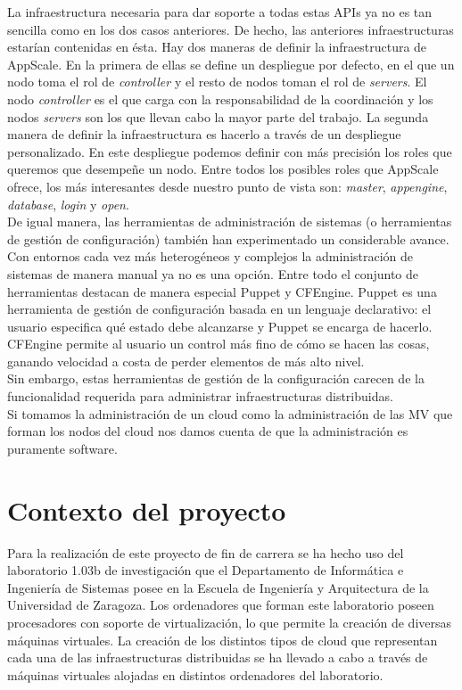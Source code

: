 La infraestructura necesaria para dar soporte a todas estas APIs ya no es tan sencilla como en los dos casos anteriores. De hecho, las anteriores infraestructuras estarían contenidas en ésta. Hay dos maneras de definir la infraestructura de AppScale. En la primera de ellas se define un despliegue por defecto, en el que un nodo toma el rol de \emph{controller} y el resto de nodos toman el rol de \emph{servers}. El nodo \emph{controller} es el que carga con la responsabilidad de la coordinación y los nodos \emph{servers} son los que llevan cabo la mayor parte del trabajo. La segunda manera de definir la infraestructura es hacerlo a través de un despliegue personalizado. En este despliegue podemos definir con más precisión los roles que queremos que desempeñe un nodo. Entre todos los posibles roles que AppScale ofrece, los más interesantes desde nuestro punto de vista son: \emph{master}, \emph{appengine}, \emph{database}, \emph{login} y \emph{open}.\\

De igual manera, las herramientas de administración de sistemas (o herramientas de gestión de configuración) también han experimentado un considerable avance. Con entornos cada vez más heterogéneos y complejos la administración de sistemas de manera manual ya no es una opción. Entre todo el conjunto de  herramientas destacan de manera especial Puppet y CFEngine. Puppet es una herramienta de gestión de configuración basada en un lenguaje  declarativo: el usuario especifica qué estado debe alcanzarse y Puppet se encarga de hacerlo. CFEngine permite al usuario un control más fino de cómo se hacen las cosas, ganando velocidad a costa de perder elementos de más alto nivel.\\

Sin embargo, estas herramientas de gestión de la configuración carecen de la funcionalidad requerida para administrar infraestructuras distribuidas.\\

Si tomamos la administración de un cloud como la administración de las MV que forman los nodos del cloud nos damos cuenta de que la administración es puramente software.\\


\section{Contexto del proyecto}

Para la realización de este proyecto de fin de carrera se ha hecho uso del laboratorio 1.03b de investigación que el Departamento de Informática e Ingeniería de Sistemas posee en la Escuela de Ingeniería y Arquitectura de la Universidad de Zaragoza. Los ordenadores que forman este laboratorio poseen procesadores con soporte de virtualización, lo que permite la creación de diversas máquinas virtuales. La creación de los distintos tipos de cloud que representan cada una de las infraestructuras distribuidas se ha llevado a cabo a través de máquinas virtuales alojadas en distintos ordenadores del laboratorio.\\

